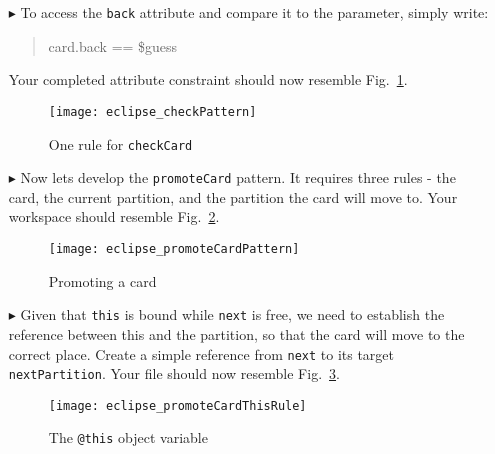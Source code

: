 \begin{itemize}
\vspace{0.5cm}

\item[$\blacktriangleright$] To access the \texttt{back} attribute and compare it to the parameter, simply write: 
{\begin{quote} card.back == \$guess \end{quote} }
Your completed attribute constraint should now resemble Fig.~\ref{fig:checkPattern}.

\begin{figure}[htbp]
\begin{center}
  \texttt{[image: eclipse\_checkPattern]}
  \caption{One rule for \texttt{checkCard}}
  \label{fig:checkPattern}
\end{center}
\end{figure} 

\clearpage

\item[$\blacktriangleright$] Now lets develop the \texttt{promoteCard} pattern. It requires three rules - the card, the current partition, and the partition the
card will move to. Your workspace should resemble Fig.~\ref{fig:promoteCardPattern}.

\begin{figure}[htbp]
\begin{center}
  \texttt{[image: eclipse\_promoteCardPattern]}
  \caption{Promoting a card}
  \label{fig:promoteCardPattern}
\end{center}
\end{figure} 

\item[$\blacktriangleright$] Given that \texttt{this} is bound while \texttt{next} is free, we need to establish the reference between this and the
partition, so that the card will move to the correct place. Create a simple reference from \texttt{next} to its target \texttt{nextPartition}. Your file should
now resemble Fig.~\ref{fig:promoteThisRule}.

\vspace{0.5cm}

\begin{figure}[htbp]
\begin{center}
  \texttt{[image: eclipse\_promoteCardThisRule]}
  \caption{The \texttt{@this} object variable}
  \label{fig:promoteThisRule}
\end{center}
\end{figure} 


\end{itemize}
